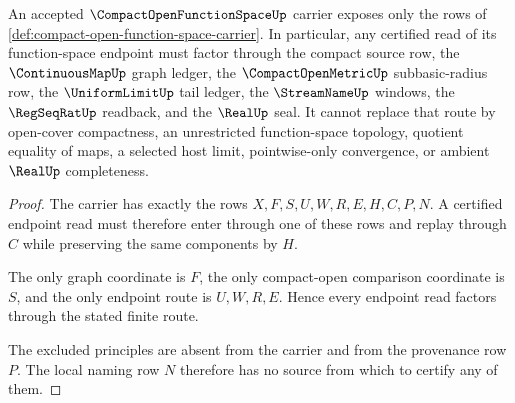 \begin{theorem}
\label{thm:compact-open-function-space-nonescape}
An accepted $\CompactOpenFunctionSpaceUp$ carrier exposes only the rows of \autoref{def:compact-open-function-space-carrier}. In particular, any certified read of its function-space endpoint must factor through the compact source row, the $\ContinuousMapUp$ graph ledger, the $\CompactOpenMetricUp$ subbasic-radius row, the $\UniformLimitUp$ tail ledger, the $\StreamNameUp$ windows, the $\RegSeqRatUp$ readback, and the $\RealUp$ seal. It cannot replace that route by open-cover compactness, an unrestricted function-space topology, quotient equality of maps, a selected host limit, pointwise-only convergence, or ambient $\RealUp$ completeness.
\end{theorem}
\begin{proof}
The carrier has exactly the rows $X,F,S,U,W,R,E,H,C,P,N$. A certified endpoint read must therefore enter through one of these rows and replay through $C$ while preserving the same components by $H$.

The only graph coordinate is $F$, the only compact-open comparison coordinate is $S$, and the only endpoint route is $U,W,R,E$. Hence every endpoint read factors through the stated finite route.

The excluded principles are absent from the carrier and from the provenance row $P$. The local naming row $N$ therefore has no source from which to certify any of them.
\end{proof}


\begin{closurestatus}{\CompactOpenFunctionSpaceUp}
  \theoryclosure{\seedClosure}
  \formalstatus{\encodedDefV}
\end{closurestatus}
